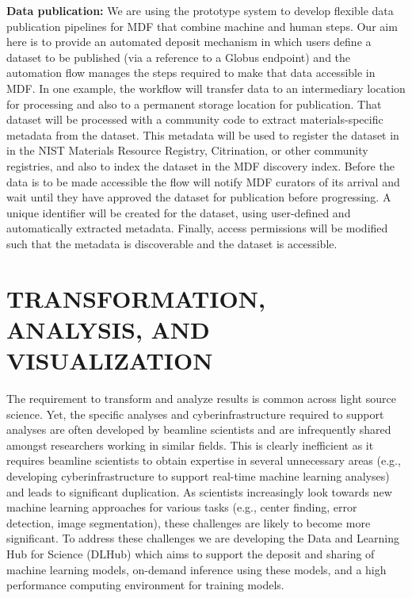 \documentclass{aip-cp}
\begin{document}
\textbf{Data publication:} We are using the prototype system to develop
flexible data publication pipelines for MDF that combine machine and human
steps. Our aim here is to provide an automated deposit mechanism in 
which users define a dataset to be published (via a reference
to a Globus endpoint) and the automation flow manages the steps required
to make that data accessible in MDF. In one example, the workflow
will transfer data to an intermediary location for processing 
and also to a permanent storage location for publication. That 
dataset will be processed with 
a community code to extract materials-specific metadata
from the dataset. This metadata will be used to register the dataset in 
in the NIST Materials Resource Registry, Citrination, or
other community registries, and also to index the dataset
in the MDF discovery index. Before the data is to be made
accessible the flow will notify MDF curators of its arrival
and wait until they have approved the dataset for publication
before progressing. A unique identifier will 
be created for the dataset, using user-defined and automatically
extracted metadata. Finally, access permissions will be 
modified such that the metadata is discoverable
and the dataset is accessible. 


\section{TRANSFORMATION, ANALYSIS, AND VISUALIZATION}

The requirement to transform and analyze results is common across light source science.
Yet, the specific analyses and cyberinfrastructure required to support analyses
are often developed by beamline scientists and are infrequently shared 
amongst researchers working in similar fields. This is clearly inefficient as it 
requires beamline scientists to obtain expertise in several unnecessary areas 
(e.g., developing cyberinfrastructure to support real-time machine learning analyses) 
and leads to significant duplication. 
As scientists increasingly look towards new machine learning approaches for various
tasks (e.g., center finding, error detection, image segmentation), 
these challenges are likely to become more significant. 
To address these challenges we are developing  
the Data and Learning Hub for Science (DLHub) which aims to 
support the deposit and sharing of machine learning models, 
on-demand inference using these models, and a high performance
computing environment for training models. 
\end{document}
